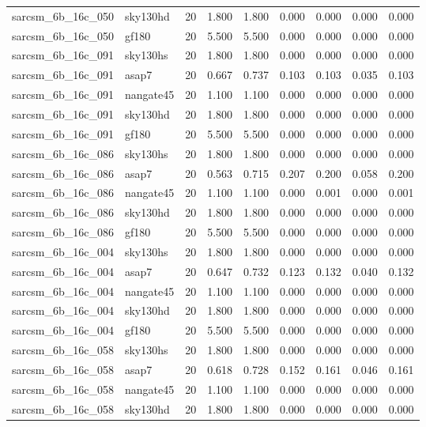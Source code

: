 \begin{tabular}{llrrrrrrr}
sarcsm\_6b\_16c\_050 & sky130hd & 20 & 1.800 & 1.800 & 0.000 & 0.000 & 0.000 & 0.000 \\
sarcsm\_6b\_16c\_050 & gf180 & 20 & 5.500 & 5.500 & 0.000 & 0.000 & 0.000 & 0.000 \\
sarcsm\_6b\_16c\_091 & sky130hs & 20 & 1.800 & 1.800 & 0.000 & 0.000 & 0.000 & 0.000 \\
sarcsm\_6b\_16c\_091 & asap7 & 20 & 0.667 & 0.737 & 0.103 & 0.103 & 0.035 & 0.103 \\
sarcsm\_6b\_16c\_091 & nangate45 & 20 & 1.100 & 1.100 & 0.000 & 0.000 & 0.000 & 0.000 \\
sarcsm\_6b\_16c\_091 & sky130hd & 20 & 1.800 & 1.800 & 0.000 & 0.000 & 0.000 & 0.000 \\
sarcsm\_6b\_16c\_091 & gf180 & 20 & 5.500 & 5.500 & 0.000 & 0.000 & 0.000 & 0.000 \\
sarcsm\_6b\_16c\_086 & sky130hs & 20 & 1.800 & 1.800 & 0.000 & 0.000 & 0.000 & 0.000 \\
sarcsm\_6b\_16c\_086 & asap7 & 20 & 0.563 & 0.715 & 0.207 & 0.200 & 0.058 & 0.200 \\
sarcsm\_6b\_16c\_086 & nangate45 & 20 & 1.100 & 1.100 & 0.000 & 0.001 & 0.000 & 0.001 \\
sarcsm\_6b\_16c\_086 & sky130hd & 20 & 1.800 & 1.800 & 0.000 & 0.000 & 0.000 & 0.000 \\
sarcsm\_6b\_16c\_086 & gf180 & 20 & 5.500 & 5.500 & 0.000 & 0.000 & 0.000 & 0.000 \\
sarcsm\_6b\_16c\_004 & sky130hs & 20 & 1.800 & 1.800 & 0.000 & 0.000 & 0.000 & 0.000 \\
sarcsm\_6b\_16c\_004 & asap7 & 20 & 0.647 & 0.732 & 0.123 & 0.132 & 0.040 & 0.132 \\
sarcsm\_6b\_16c\_004 & nangate45 & 20 & 1.100 & 1.100 & 0.000 & 0.000 & 0.000 & 0.000 \\
sarcsm\_6b\_16c\_004 & sky130hd & 20 & 1.800 & 1.800 & 0.000 & 0.000 & 0.000 & 0.000 \\
sarcsm\_6b\_16c\_004 & gf180 & 20 & 5.500 & 5.500 & 0.000 & 0.000 & 0.000 & 0.000 \\
sarcsm\_6b\_16c\_058 & sky130hs & 20 & 1.800 & 1.800 & 0.000 & 0.000 & 0.000 & 0.000 \\
sarcsm\_6b\_16c\_058 & asap7 & 20 & 0.618 & 0.728 & 0.152 & 0.161 & 0.046 & 0.161 \\
sarcsm\_6b\_16c\_058 & nangate45 & 20 & 1.100 & 1.100 & 0.000 & 0.000 & 0.000 & 0.000 \\
sarcsm\_6b\_16c\_058 & sky130hd & 20 & 1.800 & 1.800 & 0.000 & 0.000 & 0.000 & 0.000 \\

\end{tabular}
